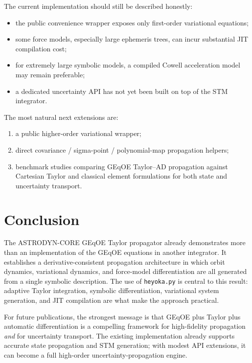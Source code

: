 \documentclass[11pt]{article}
\begin{document}
The current implementation should still be described honestly:
\begin{itemize}
    \item the public convenience wrapper exposes only first-order variational
    equations;
    \item some force models, especially large ephemeris trees, can incur
    substantial JIT compilation cost;
    \item for extremely large symbolic models, a compiled Cowell acceleration
    model may remain preferable;
    \item a dedicated uncertainty API has not yet been built on top of the STM
    integrator.
\end{itemize}

The most natural next extensions are:
\begin{enumerate}
    \item a public higher-order variational wrapper;
    \item direct covariance / sigma-point / polynomial-map propagation helpers;
    \item benchmark studies comparing GEqOE Taylor--AD propagation against
    Cartesian Taylor and classical element formulations for both state and
    uncertainty transport.
\end{enumerate}

\section{Conclusion}

The ASTRODYN-CORE GEqOE Taylor propagator already demonstrates more than an
implementation of the GEqOE equations in another integrator. It establishes a
derivative-consistent propagation architecture in which orbit dynamics,
variational dynamics, and force-model differentiation are all generated from a
single symbolic description. The use of \texttt{heyoka.py} is central to this
result: adaptive Taylor integration, symbolic differentiation, variational
system generation, and JIT compilation are what make the approach practical.

For future publications, the strongest message is that GEqOE plus Taylor plus
automatic differentiation is a compelling framework for high-fidelity
propagation \emph{and} for uncertainty transport. The existing implementation
already supports accurate state propagation and STM generation; with modest API
extensions, it can become a full high-order uncertainty-propagation engine.
\end{document}
